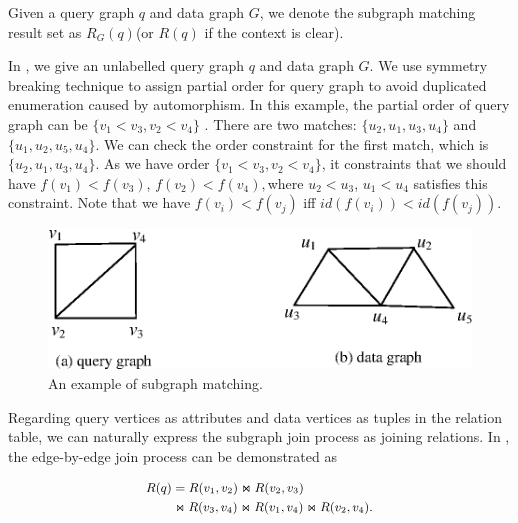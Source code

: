 Given a query graph $q$ and data graph $G$, we denote the subgraph matching result set as $R_G(q)$(or $R(q)$ if the context is clear).\\

\begin{example}
\label{ex:subgraph_isomorphism}	
In , we give an unlabelled query graph $q$ and data graph $G$. We use symmetry breaking technique\cite{Grochow2007} to assign partial order for query graph to avoid duplicated enumeration caused by automorphism. In this example, the partial order of query graph can be $\{v_1 < v_3, v_2 < v_4\}$ . There are two matches: $\{u_2, u_1, u_3, u_4\}$ and $\{u_1, u_2, u_5, u_4\}$. We can check the order constraint for the first match, which is $\{u_2, u_1, u_3, u_4\}$. As we have order $\{v_1 < v_3, v_2 < v_4\}$, it constraints that we should have $f(v_1) < f(v_3)$, $f(v_2) < f(v_4), $where $u_2 < u_3$, $u_1 < u_4$ satisfies this constraint. Note that we have $f(v_i) < f(v_j)$ iff $id(f(v_i)) < id(f(v_j))$. 
\end{example}

\begin{figure}[htb]
  \centering
  \includegraphics[scale=0.6]{figures/subg.eps}
  \caption{\small{An example of subgraph matching.}}
  \label{fig:subgraph_isomorphism}
\end{figure}

Regarding query vertices as attributes and data vertices as tuples in the relation table, we can naturally express the subgraph join process as joining relations. In , the edge-by-edge join process can be demonstrated as

\begin{equation}
\label{eq:subgraph_isomorphism}
\small
\begin{aligned}
	R(q) &= R(v_1, v_2) \Join R(v_2, v_3) \\
	&\Join R(v_3, v_4) \Join R(v_1, v_4) \Join R(v_2, v_4).
\end{aligned}
\end{equation}

